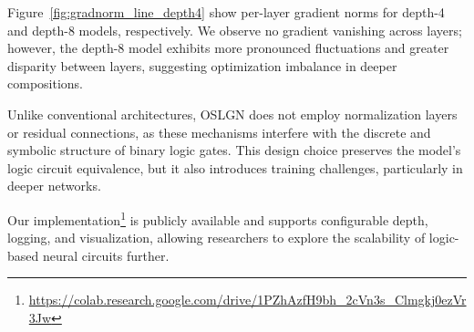 Figure~\ref{fig:gradnorm_line_depth4} show per-layer gradient norms for depth-4 and depth-8 models, respectively. 
We observe no gradient vanishing across layers; however, the depth-8 model exhibits more pronounced fluctuations and greater disparity between layers, suggesting optimization imbalance in deeper compositions.

Unlike conventional architectures, OSLGN does not employ normalization layers or residual connections, as these mechanisms interfere with the discrete and symbolic structure of binary logic gates. 
This design choice preserves the model’s logic circuit equivalence, but it also introduces training challenges, particularly in deeper networks.

Our implementation\footnote{\url{https://colab.research.google.com/drive/1PZhAzfH9bh_2cVn3s_Clmgkj0ezVr3Jw}} is publicly available and supports configurable depth, logging, and visualization, allowing researchers to explore the scalability of logic-based neural circuits further.
